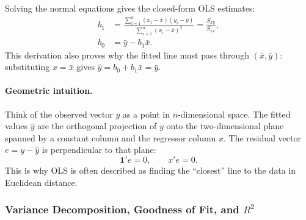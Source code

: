 \documentclass[12pt,openany]{book}
\begin{document}
Solving the normal equations gives the closed-form OLS estimates:
\begin{align*}
b_1 &= \frac{\sum_{i=1}^{n}(x_i-\bar{x})(y_i-\bar{y})}{\sum_{i=1}^{n}(x_i-\bar{x})^2}=\frac{S_{xy}}{S_{xx}},\\
b_0 &= \bar{y}-b_1\bar{x}.
\end{align*}
This derivation also proves why the fitted line must pass through \((\bar{x},\bar{y})\): substituting \(x=\bar{x}\) gives \(\hat{y}=b_0+b_1\bar{x}=\bar{y}\).

\paragraph{Geometric intuition.}
Think of the observed vector \(y\) as a point in \(n\)-dimensional space. The fitted values \(\hat{y}\) are the orthogonal projection of \(y\) onto the two-dimensional plane spanned by a constant column and the regressor column \(x\). The residual vector \(e=y-\hat{y}\) is perpendicular to that plane:
\[
\mathbf{1}'e=0, \qquad x'e=0.
\]
This is why OLS is often described as finding the ``closest'' line to the data in Euclidean distance.


\begin{center}
\end{center}


\subsubsection{Variance Decomposition, Goodness of Fit, and \texorpdfstring{\(R^2\)}{R-squared}}
\end{document}
